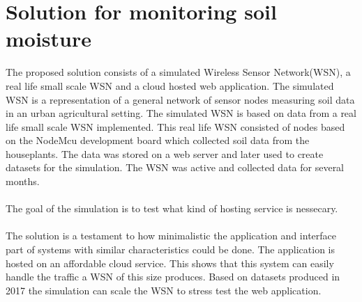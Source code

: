 \documentclass[]{uiophd}
\begin{document}
\chapter{Solution for monitoring soil moisture}
The proposed solution consists of a simulated Wireless Sensor Network(WSN), a real life small scale WSN and a cloud hosted web application. The simulated WSN is a representation of a general network of sensor nodes measuring soil data in an urban agricultural setting. The simulated WSN is based on data from a real life small scale WSN implemented. This real life WSN consisted of nodes based on the NodeMcu development board which collected soil data from the houseplants. The data was stored on a web server and later used to create datasets for the simulation. The WSN was active and collected data for several months. 
\\\\
The goal of the simulation is to test what kind of hosting service is nessecary.
\\\\
The solution is a testament to how minimalistic the application and interface part of systems with similar characteristics could be done. The application is hosted on an affordable cloud service. This shows that this system can easily handle the traffic a WSN of this size produces. Based on datasets produced in 2017 the simulation can scale the WSN to stress test the web application.
\end{document}
